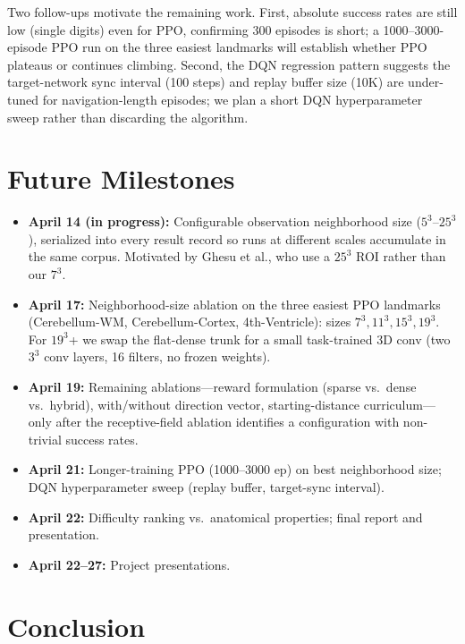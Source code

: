 \documentclass[11pt]{article}
\begin{document}
Two follow-ups motivate the remaining work. First, absolute success rates are still low (single digits) even for PPO, confirming 300 episodes is short; a 1000--3000-episode PPO run on the three easiest landmarks will establish whether PPO plateaus or continues climbing. Second, the DQN regression pattern suggests the target-network sync interval (100 steps) and replay buffer size (10K) are under-tuned for navigation-length episodes; we plan a short DQN hyperparameter sweep rather than discarding the algorithm.

\section{Future Milestones}

\begin{itemize}
\item \textbf{April 14 (in progress):} Configurable observation neighborhood size ($5^3$--$25^3$), serialized into every result record so runs at different scales accumulate in the same corpus. Motivated by Ghesu et al., who use a $25^3$ ROI rather than our $7^3$.
\item \textbf{April 17:} Neighborhood-size ablation on the three easiest PPO landmarks (Cerebellum-WM, Cerebellum-Cortex, 4th-Ventricle): sizes $7^3, 11^3, 15^3, 19^3$. For $19^3$+ we swap the flat-dense trunk for a small task-trained 3D conv (two $3^3$ conv layers, 16 filters, no frozen weights).
\item \textbf{April 19:} Remaining ablations---reward formulation (sparse vs.\ dense vs.\ hybrid), with/without direction vector, starting-distance curriculum---only after the receptive-field ablation identifies a configuration with non-trivial success rates.
\item \textbf{April 21:} Longer-training PPO (1000--3000 ep) on best neighborhood size; DQN hyperparameter sweep (replay buffer, target-sync interval).
\item \textbf{April 22:} Difficulty ranking vs.\ anatomical properties; final report and presentation.
\item \textbf{April 22--27:} Project presentations.
\end{itemize}

\section{Conclusion}
\end{document}
